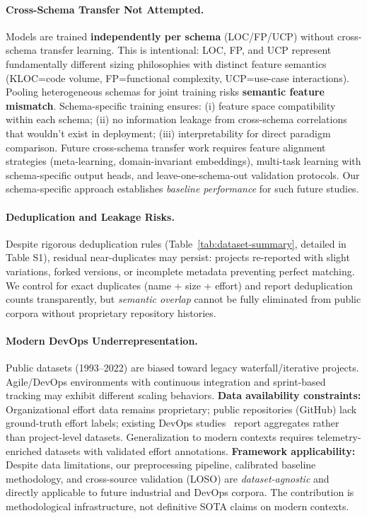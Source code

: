 \documentclass{ieeeaccess}
\begin{document}
\paragraph{Cross-Schema Transfer Not Attempted.}
Models are trained \textbf{independently per schema} (LOC/FP/UCP) without cross-schema transfer learning. This is intentional: LOC, FP, and UCP represent fundamentally different sizing philosophies with distinct feature semantics (KLOC=code volume, FP=functional complexity, UCP=use-case interactions). Pooling heterogeneous schemas for joint training risks \textbf{semantic feature mismatch}.
Schema-specific training ensures: (i) feature space compatibility within each schema; (ii) no information leakage from cross-schema correlations that wouldn't exist in deployment; (iii) interpretability for direct paradigm comparison.
Future cross-schema transfer work requires feature alignment strategies (meta-learning, domain-invariant embeddings), multi-task learning with schema-specific output heads, and leave-one-schema-out validation protocols. Our schema-specific approach establishes \textit{baseline performance} for such future studies.

\paragraph{Deduplication and Leakage Risks.}
Despite rigorous deduplication rules (Table~\ref{tab:dataset-summary}, detailed in Table S1), residual near-duplicates may persist: projects re-reported with slight variations, forked versions, or incomplete metadata preventing perfect matching.
We control for exact duplicates (name + size + effort) and report deduplication counts transparently, but \textit{semantic overlap} cannot be fully eliminated from public corpora without proprietary repository histories.

\paragraph{Modern DevOps Underrepresentation.}
Public datasets (1993--2022) are biased toward legacy waterfall/iterative projects. Agile/DevOps environments with continuous integration and sprint-based tracking may exhibit different scaling behaviors. \textbf{Data availability constraints:} Organizational effort data remains proprietary; public repositories (GitHub) lack ground-truth effort labels; existing DevOps studies~\cite{fox2017devops,chen2020devops} report aggregates rather than project-level datasets. Generalization to modern contexts requires telemetry-enriched datasets with validated effort annotations.
\textbf{Framework applicability:} Despite data limitations, our preprocessing pipeline, calibrated baseline methodology, and cross-source validation (LOSO) are \emph{dataset-agnostic} and directly applicable to future industrial and DevOps corpora. The contribution is methodological infrastructure, not definitive SOTA claims on modern contexts.
\end{document}
